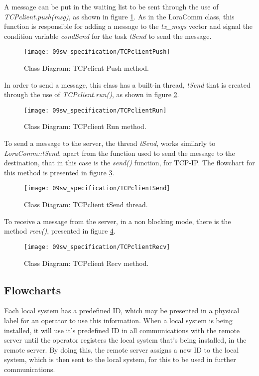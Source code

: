 A message can be put in the waiting list to be sent through the use of \textit{TCPclient.push(msg)}, as shown in figure \ref{fig:TCPclientPush}. As in the LoraComm class, this function is responsible for adding a message to the \textit{tx\_msgs} vector and signal the condition variable \textit{condSend} for the task \textit{tSend} to send the message.

\begin{figure}[H]
	\centering
	\texttt{[image: 09sw\_specification/TCPclientPush]}
	\caption{Class Diagram: TCPclient Push method.}
	\label{fig:TCPclientPush}
\end{figure}

In order to send a message, this class has a built-in thread, \textit{tSend} that is created through the use of \textit{TCPclient.run()}, as shown in figure \ref{fig:TCPclientRun}.

\begin{figure}[H]
	\centering
	\texttt{[image: 09sw\_specification/TCPclientRun]}
	\caption{Class Diagram: TCPclient Run method.}
	\label{fig:TCPclientRun}
\end{figure}

To send a message to the server, the thread \textit{tSend}, works similarly to \textit{LoraComm::tSend}, apart from the function used to send the message to the destination, that in this case is the \textit{send()} function, for TCP-IP. The flowchart for this method is presented in figure \ref{fig:TCPclientSend}.

\begin{figure}[H]
	\centering
	\texttt{[image: 09sw\_specification/TCPclientSend]}
	\caption{Class Diagram: TCPclient tSend thread.}
	\label{fig:TCPclientSend}
\end{figure}

To receive a message from the server, in a non blocking mode, there is the method \textit{recv()}, presented in figure \ref{fig:TCPclientRecv}.

\begin{figure}[H]
	\centering
	\texttt{[image: 09sw\_specification/TCPclientRecv]}
	\caption{Class Diagram: TCPclient Recv method.}
	\label{fig:TCPclientRecv}
\end{figure}

\subsection{Flowcharts}
Each local system has a predefined ID, which may be presented in a physical label for an operator to use this information. When a local system is being installed, it will use it's predefined ID in all communications with the remote server until the operator registers the local system that's being installed, in the remote server. By doing this, the remote server assigns a new ID to the local system, which is then sent to the local system, for this to be used in further communications.


